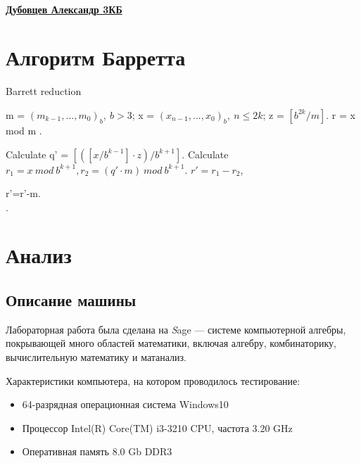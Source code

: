 \documentclass[11pt]{article}
\begin{document}
\linespread{1.3}


\begin{center}	
	\linespread{1.9}
	\vspace*{4mm}
	\\ {\bf \underline{Дубовцев Александр 3КБ}}
\end{center}
	

\section{Алгоритм Барретта }

\begin{algorithm}
	
	\caption{Barrett reduction}
	\label{alg:AlgName}
		
	\begin{algorithmic}[1]
		\Require 
		m = $(m_{k-1},...,m_{0})_{b},\: b > 3 $; 
		x = $(x_{n-1},...,x_{0})_{b},\: n \leq 2k $;
		z = $[b^{2k}/m].$
		\Ensure r = x mod m .
		
		\State Calculate q' = $[([x/b^{k-1}] \cdot z)/b^{k+1}]$. 
		\State Calculate $r_{1} = x\:mod\:b^{k+1}, r_{2} = (q' \cdot m)\: mod\: b^{k+1} $.
		 $r'=r_{1}-r_{2}$,
		
		\EndIf
		 r'=r'-m.
		\EndWhile
		\\
		.
		
	\end{algorithmic}

\end{algorithm}

\newpage

\section{Анализ}
\subsection{Описание машины}


Лабораторная работа была сделана на {\textit Sage} — системе компьютерной алгебры, покрывающей много областей математики, включая алгебру, комбинаторику, вычислительную математику и матанализ.

Характеристики компьютера, на котором проводилось тестирование:
\begin{itemize}
	\item 64-разрядная операционная система Windows10
	\item Процессор Intel(R) Core(TM) i3-3210 CPU, частота 3.20 GHz
	\item Оперативная память 8.0 Gb DDR3
\end{itemize}
\end{document}
